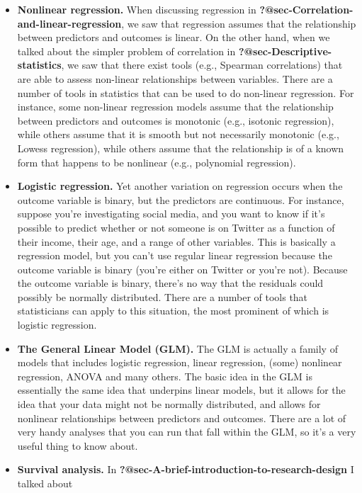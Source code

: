 \documentclass[
  a4paper,
]{book}
\begin{document}
\begin{itemize}
\item
  \textbf{Nonlinear regression.} When discussing regression in
  \textbf{?@sec-Correlation-and-linear-regression}, we saw that
  regression assumes that the relationship between predictors and
  outcomes is linear. On the other hand, when we talked about the
  simpler problem of correlation in
  \textbf{?@sec-Descriptive-statistics}, we saw that there exist tools
  (e.g., Spearman correlations) that are able to assess non-linear
  relationships between variables. There are a number of tools in
  statistics that can be used to do non-linear regression. For instance,
  some non-linear regression models assume that the relationship between
  predictors and outcomes is monotonic (e.g., isotonic regression),
  while others assume that it is smooth but not necessarily monotonic
  (e.g., Lowess regression), while others assume that the relationship
  is of a known form that happens to be nonlinear (e.g., polynomial
  regression).
\item
  \textbf{Logistic regression.} Yet another variation on regression
  occurs when the outcome variable is binary, but the predictors are
  continuous. For instance, suppose you're investigating social media,
  and you want to know if it's possible to predict whether or not
  someone is on Twitter as a function of their income, their age, and a
  range of other variables. This is basically a regression model, but
  you can't use regular linear regression because the outcome variable
  is binary (you're either on Twitter or you're not). Because the
  outcome variable is binary, there's no way that the residuals could
  possibly be normally distributed. There are a number of tools that
  statisticians can apply to this situation, the most prominent of which
  is logistic regression.
\item
  \textbf{The General Linear Model (GLM).} The GLM is actually a family
  of models that includes logistic regression, linear regression, (some)
  nonlinear regression, ANOVA and many others. The basic idea in the GLM
  is essentially the same idea that underpins linear models, but it
  allows for the idea that your data might not be normally distributed,
  and allows for nonlinear relationships between predictors and
  outcomes. There are a lot of very handy analyses that you can run that
  fall within the GLM, so it's a very useful thing to know about.
\item
  \textbf{Survival analysis.} In
  \textbf{?@sec-A-brief-introduction-to-research-design} I talked about

\end{itemize}
\end{document}
